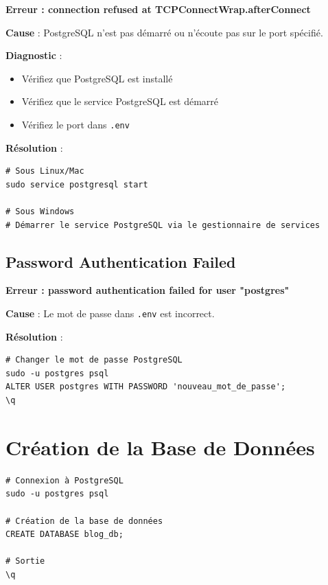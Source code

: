 \begin{errorbox}
    \textbf{Erreur : connection refused at TCPConnectWrap.afterConnect}
    
    \textbf{Cause} : PostgreSQL n'est pas démarré ou n'écoute pas sur le port spécifié.
    
    \textbf{Diagnostic} :
    \begin{itemize}
        \item Vérifiez que PostgreSQL est installé
        \item Vérifiez que le service PostgreSQL est démarré
        \item Vérifiez le port dans \texttt{.env}
    \end{itemize}
    
    \textbf{Résolution} :
    \begin{lstlisting}[style=bash]
# Sous Linux/Mac
sudo service postgresql start

# Sous Windows
# Démarrer le service PostgreSQL via le gestionnaire de services
    \end{lstlisting}
\end{errorbox}

\subsection{Password Authentication Failed}

\begin{errorbox}
    \textbf{Erreur : password authentication failed for user "postgres"}
    
    \textbf{Cause} : Le mot de passe dans \texttt{.env} est incorrect.
    
    \textbf{Résolution} :
    \begin{lstlisting}[style=bash]
# Changer le mot de passe PostgreSQL
sudo -u postgres psql
ALTER USER postgres WITH PASSWORD 'nouveau_mot_de_passe';
\q
    \end{lstlisting}
\end{errorbox}

\section{Création de la Base de Données}

\begin{lstlisting}[style=bash, caption=Création de la base de données PostgreSQL]
# Connexion à PostgreSQL
sudo -u postgres psql

# Création de la base de données
CREATE DATABASE blog_db;

# Sortie
\q
\end{lstlisting}

